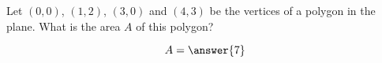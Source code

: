\documentclass{ximera}
\author{Gregory Hartman \and Matthew Carr}
\begin{document}
\begin{exercise}



Let $(0,0)$, $(1,2)$, $(3,0)$  and $(4,3)$ be the vertices of a polygon in the plane. What is the area $A$ of this polygon?
\begin{prompt}
\[
A=\answer{7}
\]
\end{prompt}


\end{exercise}
\end{document}
